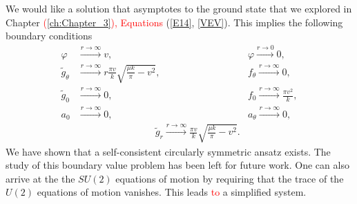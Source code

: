 We would like a solution that asymptotes to the ground state that we explored in Chapter \textcolor{red}{(}\ref{ch:Chapter_3}\textcolor{red}{), Equations} (\ref{E14}, \ref{VEV}). This implies the following boundary conditions
\begin{align}
    \varphi &\xrightarrow{r \rightarrow \infty} v, \qquad \qquad \qquad & \varphi \xrightarrow{r \rightarrow 0} 0,\\
    \tilde{g}_{\theta} &\xrightarrow{r \rightarrow \infty} r \frac{\pi v}{k} \sqrt{ \frac{\mu k}{\pi} -v^2}, &f_{\theta} \xrightarrow{r \rightarrow \infty}0,\\ 
    \tilde{g}_0 &\xrightarrow{r \rightarrow \infty} 0, &f_0  \xrightarrow{r \rightarrow \infty}\frac{\pi v^2}{k},\\
     a_0 &\xrightarrow{r \rightarrow \infty} 0, &a_{\theta} \xrightarrow{r \rightarrow \infty} 0,\\
    & \qquad\qquad\qquad\qquad  \tilde{g}_r \xrightarrow{r \rightarrow \infty} \frac{\pi v}{k} \sqrt{ \frac{\mu k}{\pi} -v^2}.  & 
\end{align}
We have shown that a self-consistent circularly symmetric ansatz exists. The study of this boundary value problem has been left for future work. One can also arrive at the the $SU(2)$ equations of motion by requiring that the trace of the $U(2)$ equations of motion vanishes. This leads \textcolor{red}{to} a simplified system.

